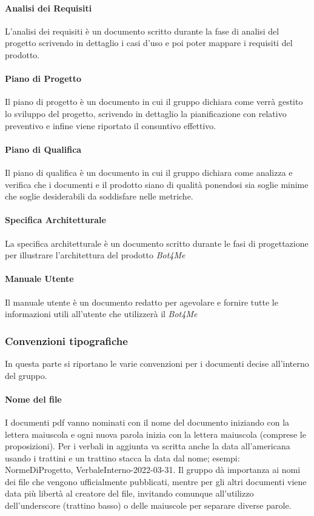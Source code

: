 \paragraph{Analisi dei Requisiti}  \hfill \break
L'analisi dei requisiti è un documento scritto durante la fase di analisi del progetto scrivendo in 
dettaglio i casi d'uso e poi poter mappare i requisiti del prodotto.

\paragraph{Piano di Progetto}  \hfill \break
Il piano di progetto è un documento in cui il gruppo dichiara come verrà gestito lo sviluppo del progetto,
scrivendo in dettaglio la pianificazione con relativo preventivo e infine viene riportato il consuntivo effettivo.

\paragraph{Piano di Qualifica} \hfill \break
Il piano di qualifica è un documento in cui il gruppo dichiara come analizza e verifica che i documenti e 
il prodotto siano di qualità ponendosi sia soglie minime che soglie desiderabili da soddisfare nelle metriche.

\paragraph{Specifica Architetturale} \hfill \break
La specifica architetturale è un documento scritto durante le fasi di progettazione per illustrare l'architettura 
del prodotto \emph{Bot4Me}

\paragraph{Manuale Utente} \hfill \break
Il manuale utente è un documento redatto per agevolare e fornire tutte le informazioni utili all'utente che utilizzerà 
il \emph{Bot4Me}

\subsubsection{Convenzioni tipografiche} 
In questa parte si riportano le varie convenzioni per i documenti decise all'interno del gruppo.
\paragraph{Nome del file}  \hfill \break
I documenti pdf vanno nominati con il nome del documento iniziando con la lettera maiuscola 
e ogni nuova parola inizia con la lettera maiuscola (comprese le proposizioni). Per i verbali in 
aggiunta va scritta anche la data all'americana usando i trattini e un trattino stacca la data 
dal nome; esempi: NormeDiProgetto, VerbaleInterno-2022-03-31. \newline
Il gruppo dà importanza ai nomi dei file che vengono ufficialmente pubblicati, mentre per gli 
altri documenti viene data più libertà al creatore del file, invitando comunque all'utilizzo 
dell'underscore (trattino basso) o delle maiuscole per separare diverse parole.


